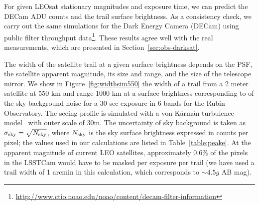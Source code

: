 \documentclass[twocolumn,trackchanges]{aastex63}
\begin{document}

For given LEOsat stationary magnitudes and exposure time, we can predict the DECam ADU counts and the trail surface brightness.
As a consistency check, we carry out the same simulations for the Dark Energy Camera (DECam) using public filter throughput data\footnote{\url{http://www.ctio.noao.edu/noao/content/decam-filter-information}}.  These results agree well with the real measurements, which are presented in Section~\ref{sec:obs-darksat}.


The width of the satellite trail at a given surface brightness depends on the PSF, the satellite apparent magnitude, its size and range, and the size of the telescope mirror. We show in Figure~\ref{fig:widthsim550} the width of a trail from a 2 meter satellite at 550 km and range 1000 km at a surface brightness corresponding to  of the sky background noise for a 30 sec exposure in 6 bands for the Rubin Observatory.  The seeing profile is simulated with a von K\'{a}rm\'{a}n turbulence model~\citep{vk1, vk2} with outer scale of 30m.
The uncertainty of sky background is taken as $\sigma_{\rm sky}=\sqrt{N_{\rm sky}}$, where $N_{\rm sky}$ is the sky surface brightness expressed in counts per pixel; the values used in our calculations are listed in Table~\ref{table:peake}.
At the apparent magnitude of current LEO satellites, approximately 0.6\% of the pixels in the LSSTCam  would have to be masked per exposure per trail (we have used a trail width of 1 arcmin in this calculation, which corresponds to $\sim4.5g$ AB mag).
\end{document}
